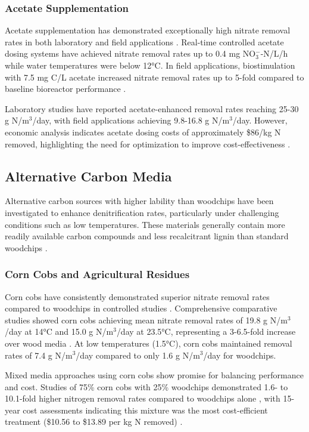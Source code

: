 \documentclass[12pt,a4paper]{article}
\begin{document}
\subsubsection{Acetate Supplementation}

Acetate supplementation has demonstrated exceptionally high nitrate removal rates in both laboratory and field applications \citep{RN196}. Real-time controlled acetate dosing systems have achieved nitrate removal rates up to 0.4 mg NO$_3^-$-N/L/h while water temperatures were below 12°C. In field applications, biostimulation with 7.5 mg C/L acetate increased nitrate removal rates up to 5-fold compared to baseline bioreactor performance \citep{RN196}.

Laboratory studies have reported acetate-enhanced removal rates reaching 25-30 g N/m$^3$/day, with field applications achieving 9.8-16.8 g N/m$^3$/day. However, economic analysis indicates acetate dosing costs of approximately \$86/kg N removed, highlighting the need for optimization to improve cost-effectiveness \citep{RN196}.

\subsection{Alternative Carbon Media}

Alternative carbon sources with higher lability than woodchips have been investigated to enhance denitrification rates, particularly under challenging conditions such as low temperatures. These materials generally contain more readily available carbon compounds and less recalcitrant lignin than standard woodchips \citep{RN624}.

\subsubsection{Corn Cobs and Agricultural Residues}

Corn cobs have consistently demonstrated superior nitrate removal rates compared to woodchips in controlled studies \citep{RN350, RN624}. Comprehensive comparative studies showed corn cobs achieving mean nitrate removal rates of 19.8 g N/m$^3$/day at 14°C and 15.0 g N/m$^3$/day at 23.5°C, representing a 3-6.5-fold increase over wood media \citep{RN350, RN624}. At low temperatures (1.5°C), corn cobs maintained removal rates of 7.4 g N/m$^3$/day compared to only 1.6 g N/m$^3$/day for woodchips.

Mixed media approaches using corn cobs show promise for balancing performance and cost. Studies of 75\% corn cobs with 25\% woodchips demonstrated 1.6- to 10.1-fold higher nitrogen removal rates compared to woodchips alone \citep{RN350}, with 15-year cost assessments indicating this mixture was the most cost-efficient treatment (\$10.56 to \$13.89 per kg N removed) \citep{RN350}.
\end{document}
